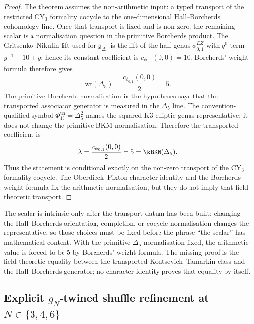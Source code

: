 \begin{proof}
The theorem assumes the non-arithmetic input: a typed transport of the
restricted CY$_3$ formality cocycle to the one-dimensional
Hall--Borcherds cohomology line. Once that transport is fixed and is
non-zero, the remaining scalar is a normalisation question in the
primitive Borcherds product. The Gritsenko--Nikulin lift used for
$\mathfrak g_{\Delta_5}$ is the lift of the half-genus
$\phi_{0,1}^{EZ}$ with $q^0$ term $y^{-1}+10+y$; hence its constant
coefficient is $c_{\phi_{0,1}}(0,0)=10$. Borcherds' weight formula
therefore gives
\[
 \mathrm{wt}(\Delta_5)=\frac{c_{\phi_{0,1}}(0,0)}{2}=5 .
\]
The primitive Borcherds normalisation in the hypotheses says that the
transported associator generator is measured in the $\Delta_5$ line.
The convention-qualified symbol
$\Phi_{10}^{\mathrm{un}}=\Delta_5^2$ names the squared K3
elliptic-genus representative; it does not change the primitive BKM
normalisation. Therefore the transported coefficient is
\[
 \lambda=\frac{c_{\phi_{0,1}}(0,0)}{2}=5
 =\kBKM(\Delta_5).
\]
Thus the statement is conditional exactly on the non-zero transport of
the CY$_3$ formality cocycle. The Oberdieck--Pixton character identity
and the Borcherds weight formula fix the arithmetic normalisation, but
they do not imply that field-theoretic transport.
\end{proof}

\begin{remark}
\label{rem:associator-scalar-intrinsic}
The scalar is intrinsic only after the transport datum has been built:
changing the Hall--Borcherds orientation, completion, or cocycle
normalisation changes the representative, so those choices must be
fixed before the phrase ``the scalar'' has mathematical content. With
the primitive $\Delta_5$ normalisation fixed, the arithmetic value is
forced to be $5$ by Borcherds' weight formula. The missing proof is the
field-theoretic equality between the transported Kontsevich--Tamarkin
class and the Hall--Borcherds generator; no character identity proves
that equality by itself.
\end{remark}

\subsection{Explicit \texorpdfstring{$g_N$}{g-N}-twined shuffle refinement at \texorpdfstring{$N \in \{3, 4, 6\}$}{N in 3, 4, 6}}
\label{subsec:shuffle-refinement-CHL}

